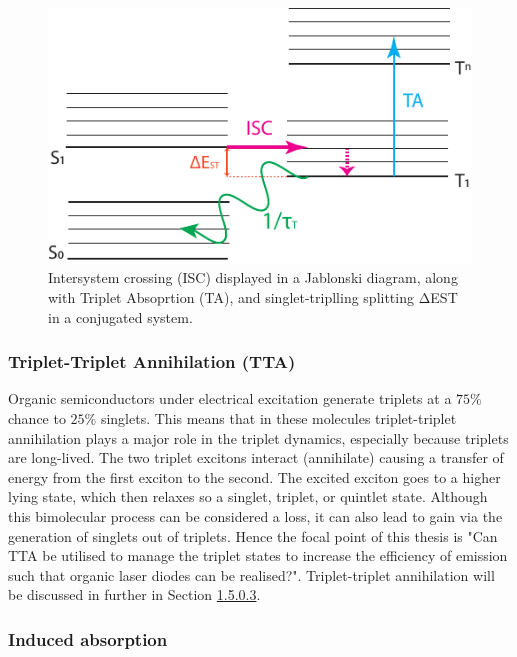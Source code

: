 \documentclass[
  letterpaper,
  DIV=11,
  numbers=noendperiod,
  oneside]{scrreprt}
\begin{document}
\begin{figure}

{\centering \includegraphics{./images/ISC.pdf}

}

\caption{\label{fig-ISC}Intersystem crossing (ISC) displayed in a
Jablonski diagram, along with Triplet Absoprtion (TA), and
singlet-triplling splitting {ΔEST} in a conjugated system.}

\end{figure}

\hypertarget{triplet-triplet-annihilation-tta}{%
\subsubsection{Triplet-Triplet Annihilation
(TTA)}\label{triplet-triplet-annihilation-tta}}

Organic semiconductors under electrical excitation generate triplets at
a \(75\%\) chance to \(25\%\) singlets. This means that in these
molecules triplet-triplet annihilation plays a major role in the triplet
dynamics, especially because triplets are long-lived. The two triplet
excitons interact (annihilate) causing a transfer of energy from the
first exciton to the second. The excited exciton goes to a higher lying
state, which then relaxes so a singlet, triplet, or quintlet state.
Although this bimolecular process can be considered a loss, it can also
lead to gain via the generation of singlets out of triplets. Hence the
focal point of this thesis is "Can TTA be utilised to manage the triplet
states to increase the efficiency of emission such that organic laser
diodes can be realised?". Triplet-triplet annihilation will be discussed
in further in Section \protect\hyperlink{sec:type}{1.5.0.3}.

\hypertarget{induced-absorption}{%
\subsubsection{Induced absorption}\label{induced-absorption}}
\end{document}
